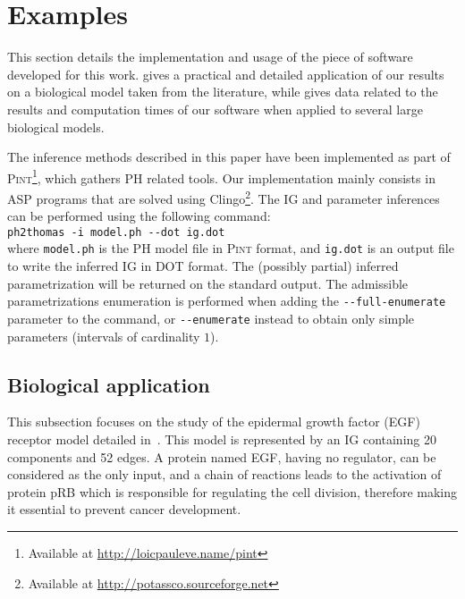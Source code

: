 \section{Examples}\label{sec:examples}

This section details the implementation and usage of the piece of software developed for this work.
 gives a practical and detailed application of our results on a biological model taken from the literature,
while  gives data related to the results and computation times of our software when applied to several large biological models.

\medskip

The inference methods described in this paper have been implemented as part of
\textsc{Pint}\footnote{Available at \url{http://loicpauleve.name/pint}}, which gathers PH related tools.
Our implementation mainly consists in ASP programs that are solved using
Clingo\footnote{Available at \url{http://potassco.sourceforge.net}}.
The IG and parameter inferences can be performed using the following command:\\
  \hspace*{\parindent}\texttt{ph2thomas -i model.ph -{}-dot ig.dot}\\
where \texttt{model.ph} is the PH model file in \textsc{Pint} format,
and \texttt{ig.dot} is an output file to write the inferred IG in DOT format.
The (possibly partial) inferred parametrization will be returned on the standard output.
The admissible parametrizations enumeration is performed when adding the \texttt{-{}-full-enumerate} parameter to the command,
or \texttt{-{}-enumerate} instead to obtain only simple parameters (intervals of cardinality $1$).



\subsection{Biological application}\label{ssec:appli}

This subsection focuses on the study of the epidermal growth factor (EGF) receptor model detailed in~\cite{Sahin09}.
This model is represented by an IG containing 20 components and 52 edges.
A protein named EGF, having no regulator, can be considered as the only input,
and a chain of reactions leads to the activation of protein pRB which is responsible for regulating the cell division,
therefore making it essential to prevent cancer development.

